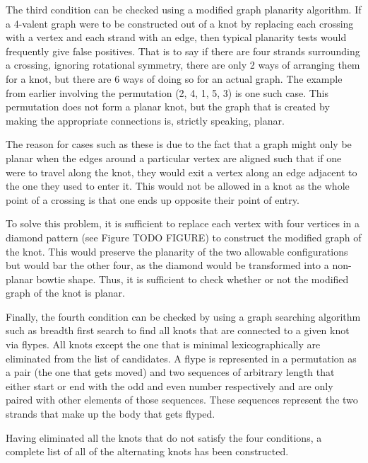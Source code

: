 \begin{paper}
The third condition can be checked using a modified graph planarity algorithm.
If a 4-valent graph were to be constructed out of a knot by replacing each
crossing with a vertex and each strand with an edge, then typical planarity
tests would frequently give false positives.
That is to say if there are four strands surrounding a crossing, ignoring
rotational symmetry, there are only 2 ways of arranging them for a knot, but
there are 6 ways of doing so for an actual graph.
The example from earlier involving the permutation (2, 4, 1, 5, 3) is one such
case.
This permutation does not form a planar knot, but the graph that is created by
making the appropriate connections is, strictly speaking, planar.

The reason for cases such as these is due to the fact that a graph might only be
planar when the edges around a particular vertex are aligned such that if one
were to travel along the knot, they would exit a vertex along an edge adjacent
to the one they used to enter it.
This would not be allowed in a knot as the whole point of a crossing is that one
ends up opposite their point of entry.

To solve this problem, it is sufficient to replace each vertex with four
vertices in a diamond pattern (see Figure TODO FIGURE) to construct the modified
graph of the knot.
This would preserve the planarity of the two allowable configurations but would
bar the other four, as the diamond would be transformed into a non-planar
bowtie shape.
Thus, it is sufficient to check whether or not the modified graph of the knot is
planar.

Finally, the fourth condition can be checked by using a graph searching
algorithm such as breadth first search to find all knots that are connected to a
given knot via flypes.
All knots except the one that is minimal lexicographically are eliminated from
the list of candidates.
A flype is represented in a permutation as a pair (the one that gets moved) and
two sequences of arbitrary length that either start or end with the odd and even
number respectively and are only paired with other elements of those sequences.
These sequences represent the two strands that make up the body that gets
flyped.

Having eliminated all the knots that do not satisfy the four conditions, a
complete list of all of the alternating knots has been constructed.



\end{paper}
